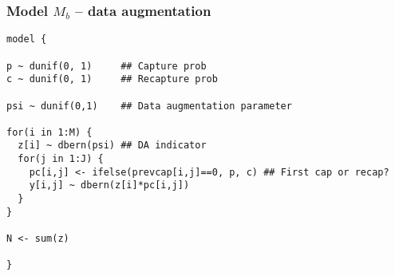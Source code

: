 \documentclass[color=usenames,dvipsnames]{beamer}\usepackage[]{graphicx}\usepackage[]{xcolor}
\makeatletter
\newenvironment{kframe}{%
 \def\at@end@of@kframe{}%
 \ifinner\ifhmode%
  \def\at@end@of@kframe{\end{minipage}}%
  \begin{minipage}{\columnwidth}%
 \fi\fi%
 \def\FrameCommand##1{\hskip\@totalleftmargin \hskip-\fboxsep
 \colorbox{shadecolor}{##1}\hskip-\fboxsep
     \hskip-\linewidth \hskip-\@totalleftmargin \hskip\columnwidth}%
 \MakeFramed {\advance\hsize-\width
   \@totalleftmargin\z@ \linewidth\hsize
   \@setminipage}}%
 {\par\unskip\endMakeFramed%
 \at@end@of@kframe}
\newenvironment{knitrout}{}{} %
\makeatother
\begin{document}
\begin{frame}[fragile]
  \frametitle{Model $M_b$ -- data augmentation}
\vspace{-3pt}
\begin{knitrout}\footnotesize
{}\color{fgcolor}\begin{kframe}
\begin{verbatim}
model {

p ~ dunif(0, 1)     ## Capture prob
c ~ dunif(0, 1)     ## Recapture prob

psi ~ dunif(0,1)    ## Data augmentation parameter

for(i in 1:M) {     
  z[i] ~ dbern(psi) ## DA indicator
  for(j in 1:J) {
    pc[i,j] <- ifelse(prevcap[i,j]==0, p, c) ## First cap or recap?
    y[i,j] ~ dbern(z[i]*pc[i,j])
  }
}

N <- sum(z)

}
\end{verbatim}
\end{kframe}
\end{knitrout}
\end{frame}
\end{document}
